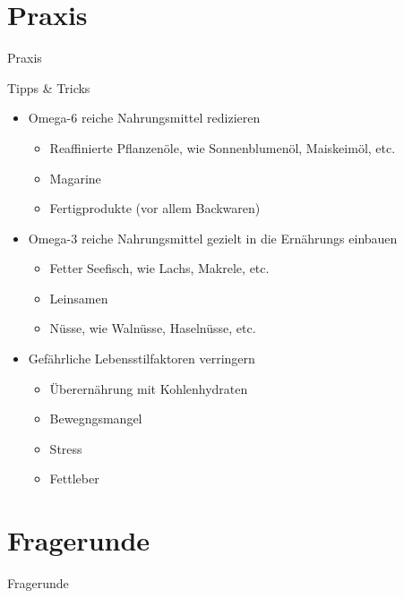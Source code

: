 \documentclass[xcolor=dvipsnames]{beamer}
\begin{document}
    \section{Praxis}
    {
        \begin{frame}
            \begin{center}
                \Huge Praxis
            \end{center}
        \end{frame}
    }

    \begin{frame}{Tipps \& Tricks}
        \begin{itemize}
            \setlength\itemsep{1em}
            \item Omega-6 reiche Nahrungsmittel redizieren
            \begin{itemize}
                \item Reaffinierte Pflanzenöle, wie Sonnenblumenöl, Maiskeimöl, etc.
                \item Magarine
                \item Fertigprodukte (vor allem Backwaren)
            \end{itemize}
            \item Omega-3 reiche Nahrungsmittel gezielt in die Ernährungs einbauen
            \begin{itemize}
                \item Fetter Seefisch, wie Lachs, Makrele, etc.
                \item Leinsamen
                \item Nüsse, wie Walnüsse, Haselnüsse, etc.
            \end{itemize}
            \item Gefährliche Lebensstilfaktoren verringern
            \begin{itemize}
                \item Überernährung mit Kohlenhydraten
                \item Bewegngsmangel
                \item Stress
                \item Fettleber
            \end{itemize}
        \end{itemize}
    \end{frame}

    \section{Fragerunde}
    {
        \begin{frame}
            \begin{center}
                \Huge Fragerunde
            \end{center}
        \end{frame}
    }
\end{document}
